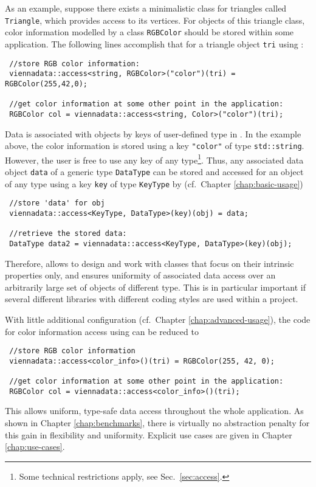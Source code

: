As an example, suppose there exists a minimalistic class for triangles called \lstinline|Triangle|, 
which provides access to its vertices. For objects of this triangle class, color information modelled by a class \lstinline|RGBColor| should be stored within some application.
The following lines accomplish that for a triangle object \lstinline|tri| using {\ViennaData}:
\begin{lstlisting}
 //store RGB color information:
 viennadata::access<string, RGBColor>("color")(tri) = RGBColor(255,42,0);

 //get color information at some other point in the application:
 RGBColor col = viennadata::access<string, Color>("color")(tri);
\end{lstlisting}
Data is associated with objects by keys of user-defined type in {\ViennaData}. In the example above,
the color information is stored using a key \lstinline|"color"| of type \lstinline|std::string|.
However, the user is free to use any key of any type\footnote{Some technical restrictions apply, see Sec.~\ref{sec:access}.}.
Thus, any associated data object \lstinline|data| of a generic type \lstinline|DataType| can be stored and accessed for an object of any type using a key \lstinline|key| of type \lstinline|KeyType|
by (cf.~Chapter \ref{chap:basic-usage})
\begin{lstlisting}
 //store 'data' for obj
 viennadata::access<KeyType, DataType>(key)(obj) = data;

 //retrieve the stored data:
 DataType data2 = viennadata::access<KeyType, DataType>(key)(obj);
\end{lstlisting}
Therefore, {\ViennaData} allows to design and work with classes that focus on their intrinsic properties only, and 
ensures uniformity of associated data access over an arbitrarily large set of objects of different type.
This is in particular important if several different libraries with different coding styles are used within a project.

With little additional configuration (cf.~Chapter \ref{chap:advanced-usage}), the code for color information access using {\ViennaData} can be reduced to
\begin{lstlisting}
 //store RGB color information
 viennadata::access<color_info>()(tri) = RGBColor(255, 42, 0);

 //get color information at some other point in the application:
 RGBColor col = viennadata::access<color_info>()(tri);
\end{lstlisting}
This allows uniform, type-safe data access throughout the whole application.
As shown in Chapter \ref{chap:benchmarks}, there is virtually no abstraction penalty for this gain in flexibility and uniformity. Explicit use cases are given in Chapter \ref{chap:use-cases}.


